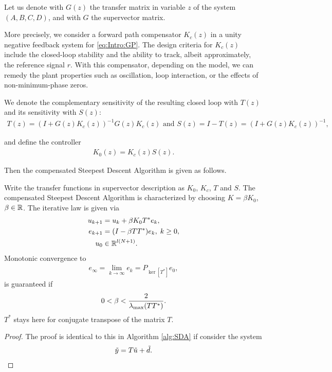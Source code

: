 Let us denote with $G(z)$ the transfer matrix in variable $z$ of the system $(A,B,C,D)$, and with $G$ the supervector matrix. 

More precisely, we consider a forward path compensator $K_c(z)$ in a unity negative feedback system for \eqref{eq:Intro:GP}. 
The design criteria for $K_c(z)$ include the closed-loop stability and the ability to track, albeit approximately, the reference signal $r$. With this compensator, depending on the model, we can remedy the plant properties such as oscillation, loop interaction, or the effects of non-minimum-phase zeros. 

We denote the complementary sensitivity of the resulting closed loop with $T(z)$ and its sensitivity with $S(z)$:
\begin{align}
T(z) = (I + G(z) K_c(z))^{-1}G(z) K_c(z) \text{ and } S(z)  = I - T(z) =  (I + G(z) K_c(z))^{-1}, 
\end{align}

and define the controller
\begin{align}
K_0(z) = K_c(z) S(z). 
\end{align}

Then the compensated Steepest Descent Algorithm is given as follows. 

\begin{alg}
	\label{alg: FBDesign}
	Write the transfer functions in supervector description as 
	$K_0$, $K_c$, $T$ and $S$. The compensated Steepest Descent Algorithm is characterized by choosing  $K = \beta K_0$, $\beta \in {\mathbb{R}}$. 
	The iterative law is given via 
	\begin{align}
	\label{eq:errFBDesign}
	\begin{split}
	u_{k+1} &= u_k + \beta K_0 T^* e_k, \\
	e_{k+1} &= (I- \beta T T^*) e_{k}, \; k\geq 0,\\
	u_0& \in {\mathbb{R}}^{l (N+1)}. 
	\end{split}	
	\end{align}
	Monotonic convergence to 
	\begin{align}
	\label{eq:FDErrLim} 
	e_\infty  = \lim_{k\to\infty} e_k = P_{\ker[T^*]}e_0,
	\end{align} 
	is guaranteed if
	\begin{align*}
	0 <\beta < \frac{2}{\lambda_{\mathrm{max}}(T T^*)}.
\end{align*}
$T^*$ stays here for conjugate transpose of the matrix $T$. 
\end{alg}
\begin{proof}
	The proof is identical to this in Algorithm \ref{alg:SDA} if consider the system 
	\begin{align}
	\tilde{y} = T\tilde{u} + \tilde{d}.
	\end{align}
\end{proof}


